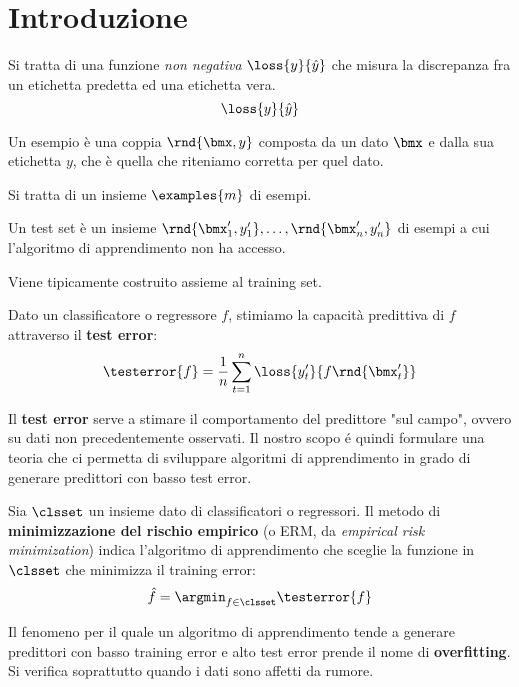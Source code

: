 \documentclass[\main/main.tex]{subfiles}
\begin{document}
\chapter{Introduzione}
\begin{multicols}{2}
\begin{definition}
    Si tratta di una funzione \textit{non negativa} \(\loss{y}{\hat{y}}\) che misura la discrepanza fra un etichetta predetta ed una etichetta vera.
    \[
        \loss{y}{\hat{y}}
    \]
\end{definition}
\begin{definition}[Esempio]
    Un esempio è una coppia \(\rnd{\bmx, y}\) composta da un dato \(\bmx\) e dalla sua etichetta \(y\), che è quella che riteniamo corretta per quel dato.
\end{definition}
\begin{definition}
    Si tratta di un insieme \(\examples{m}\) di esempi.
\end{definition}
\begin{definition}
    Un test set è un insieme \(\rnd{\bmx'_1, y'_1}, \ldots, \rnd{\bmx'_n, y'_n}\) di esempi a cui l'algoritmo di apprendimento non ha accesso.
    
    Viene tipicamente costruito assieme al training set.
\end{definition}
\begin{definition}
    Dato un classificatore o regressore \(f\), stimiamo la capacità predittiva di \(f\) attraverso il \textbf{test error}:
    \[
        \testerror{f} = \frac{1}{n}\sum_{t=1}^n \loss{y'_t}{f\rnd{\bmx'_t}}
    \]
\end{definition}
\begin{observation}
    Il \textbf{test error} serve a stimare il comportamento del predittore "sul campo", ovvero su dati non precedentemente osservati. Il nostro scopo é quindi formulare una teoria che ci permetta di sviluppare algoritmi di apprendimento in grado di generare predittori con basso test error.
\end{observation}
\begin{definition}
    Sia \(\clsset\) un insieme dato di classificatori o regressori. Il metodo di \textbf{minimizzazione del rischio empirico} (o ERM, da \textit{empirical risk minimization}) indica l'algoritmo di apprendimento che sceglie la funzione in \(\clsset\) che minimizza il training error:
    \[
        \hat{f} = \argmin_{f \in \clsset} \testerror{f}
    \]
\end{definition}
\begin{definition}[Overfitting]
    Il fenomeno per il quale un algoritmo di apprendimento tende a generare predittori con basso training error e alto test error prende il nome di \textbf{overfitting}. Si verifica soprattutto quando i dati sono affetti da rumore.
    

\end{definition}
\end{multicols}
\end{document}
